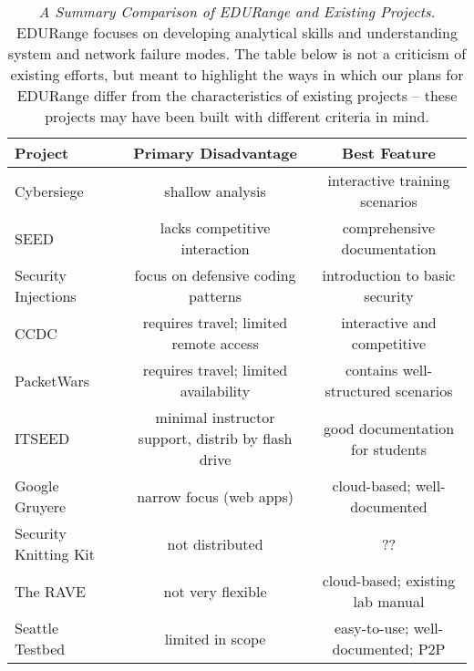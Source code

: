 \begin{table*}[ht]
  \caption{{\em A Summary Comparison of EDURange and Existing Projects.}
      EDURange focuses on developing analytical skills and understanding
      system and network failure modes. The table below is not a criticism
      of existing efforts, but meant to highlight the ways in which our
      plans for EDURange differ from the characteristics of existing
      projects -- these projects may have been built with different
      criteria in mind.}
  \begin{center}
    \begin{tabular}{|l||c|c|}
    \hline
    {\bf Project} & {\bf Primary Disadvantage} & {\bf Best Feature} \\
    \hline
     Cybersiege & shallow analysis
                & interactive training scenarios\\
    \hline
     SEED & lacks competitive interaction
          & comprehensive documentation\\
    \hline
     Security Injections & focus on defensive coding patterns
                         & introduction to basic security\\
    \hline
     CCDC & requires travel; limited remote access
          & interactive and competitive\\
    \hline
     PacketWars & requires travel; limited availability
                & contains well-structured scenarios\\
    \hline
    ITSEED & minimal instructor support, distrib by flash drive
              & good documentation for students\\
    \hline
     Google Gruyere & narrow focus (web apps)
                    & cloud-based; well-documented\\
    \hline
    Security Knitting Kit & not distributed & ?? \\
    \hline
    The RAVE & not very flexible & cloud-based; existing lab manual \\
    \hline
    Seattle Testbed & limited in scope & easy-to-use; well-documented; P2P \\
    \end{tabular}
  \end{center}
  \label{table:compare}
\end{table*}



